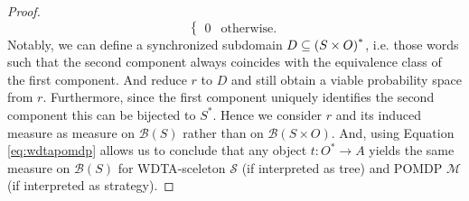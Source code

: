 \begin{proof}
\begin{equation}
\begin{cases}
      0 &\text{otherwise}.
    \end{cases}
    \label{eq:wdtapomdp}
  \end{equation}
  Notably, we can define a synchronized subdomain 
  $D\subseteq \left(S\times O\right)^{*}$, i.e. those words such that the second 
  component always coincides with the equivalence class of the first component.
  And reduce $r$ to $D$ and still obtain a viable probability space from $r$.
  Furthermore, since the first component uniquely identifies the second 
  component this can be bijected to $S^{*}$. Hence we consider $r$ and its 
  induced measure as measure on $\mathcal{B}(S)$ rather than on 
  $\mathcal{B}(S\times O)$. And, using Equation \ref{eq:wdtapomdp}
  allows us to conclude that any object $t:O^{*}\rightarrow A$ yields the same
  measure on $\mathcal{B}(S)$ for \ac{WDTA}-sceleton $\mathcal{S}$ (if 
  interpreted as tree) and \ac{POMDP} $\mathcal{M}$ (if interpreted as 
  strategy).
\end{proof}

